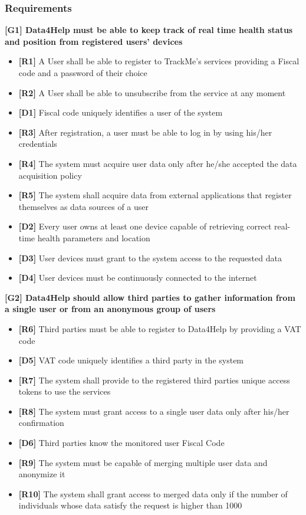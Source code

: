 \subsubsection{Requirements}
\textbf{[G1] Data4Help must be able to keep track of real time health status and position from registered users' devices}
\begin{itemize}
	\item \textbf{[R1]} A User shall be able to register to TrackMe's services providing a Fiscal code and a password of their choice
	\item \textbf{[R2]} A User shall be able to unsubscribe from the service at any moment
	\item \textbf{[D1]} Fiscal code uniquely identifies a user of the system
	\item \textbf{[R3]} After registration, a user must be able to log in by using his/her credentials
	\item \textbf{[R4]} The system must acquire user data only after he/she accepted the data acquisition policy
	\item \textbf{[R5]} The system shall acquire data from external applications that register themselves as data sources of a user
	\item \textbf{[D2]} Every user owns at least one device capable of retrieving correct real-time health parameters and location
	\item \textbf{[D3]} User devices must grant to the system access to the requested data
	\item \textbf{[D4]} User devices must be continuously connected to the internet
\end{itemize}

\textbf{[G2] Data4Help should allow third parties to gather information from a single user or from an anonymous group of users}
\begin{itemize}
	\item \textbf{[R6]} Third parties must be able to register to Data4Help by providing a VAT code
	\item \textbf{[D5]} VAT code uniquely identifies a third party in the system
	\item \textbf{[R7]} The system shall provide to the registered third parties unique access tokens to use the services
	\item \textbf{[R8]} The system must grant access to a single user data only after his/her confirmation
	\item \textbf{[D6]} Third parties know the monitored user Fiscal Code
	\item \textbf{[R9]} The system must be capable of merging multiple user data and anonymize it
	\item \textbf{[R10]} The system shall grant access to merged data only if the number	of individuals	whose data satisfy the request is higher than	 1000
\end{itemize}

